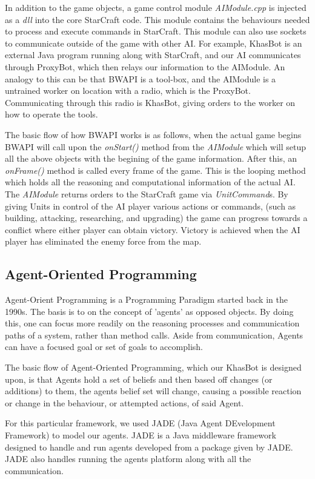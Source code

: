 \documentclass[letterpaper]{article}
\begin{document}
In addition to the game objects, a game control module \emph{AIModule.cpp} is injected as a \emph{dll} into the core StarCraft code.  This module contains the behaviours needed to process and execute commands in StarCraft.  This module can also use sockets to communicate outside of the game with other AI. For example, KhasBot is an external Java program running along with StarCraft, and our AI communicates through ProxyBot, which then relays our information to the AIModule.  An analogy to this can be that BWAPI is a tool-box, and the AIModule is a untrained worker on location with a radio, which is the ProxyBot.  Communicating through this radio is KhasBot, giving orders to the worker on how to operate the tools.

The basic flow of how BWAPI works is as follows, when the actual game begins BWAPI will call upon the \emph{onStart()} method from the \emph{AIModule} which will setup all the above objects with the begining of the game information.  After this, an \emph{onFrame()} method is called every frame of the game.  This is the looping method which holds all the reasoning and computational information of the actual AI.  The \emph{AIModule} returns orders to the StarCraft game via \emph{UnitCommand}s.  By giving Units in control of the AI player various actions or commands, (such as building, attacking, researching, and upgrading) the game can progress towards a conflict where either player can obtain victory. Victory is achieved when the AI player has eliminated the enemy force from the map.

\subsection{Agent-Oriented Programming}
Agent-Orient Programming is a Programming Paradigm started back in the 1990s.  The basis is to on the concept of 'agents' as opposed objects.  By doing this, one can focus more readily on the reasoning processes and communication paths of a system, rather than method calls\cite{AOP}.  Aside from communication, Agents can have a focused goal or set of goals to accomplish.

The basic flow of Agent-Oriented Programming, which our KhasBot is designed upon, is that Agents hold a set of beliefs and then based off changes (or additions) to them, the agents belief set will change, causing a possible reaction or change in the behaviour, or attempted actions, of said Agent.

For this particular framework, we used JADE (Java Agent DEvelopment Framework) to model our agents.  JADE is a Java middleware framework designed to handle and run agents developed from a package given by JADE.  JADE also handles running the agents platform along with all the communication\cite{JADEbook}.
\end{document}
